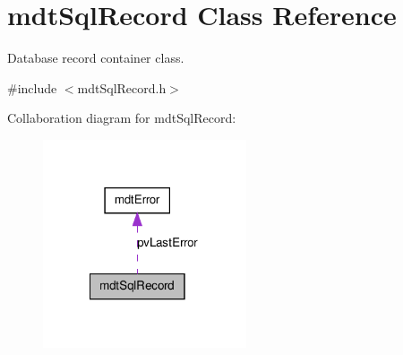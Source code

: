 \hypertarget{classmdt_sql_record}{
\section{mdtSqlRecord Class Reference}
\label{classmdt_sql_record}
}


Database record container class.  




{\ttfamily \#include $<$mdtSqlRecord.h$>$}



Collaboration diagram for mdtSqlRecord:
\nopagebreak
\begin{figure}[H]
\begin{center}
\leavevmode
\includegraphics[width=170pt]{classmdt_sql_record__coll__graph}
\end{center}
\end{figure}
